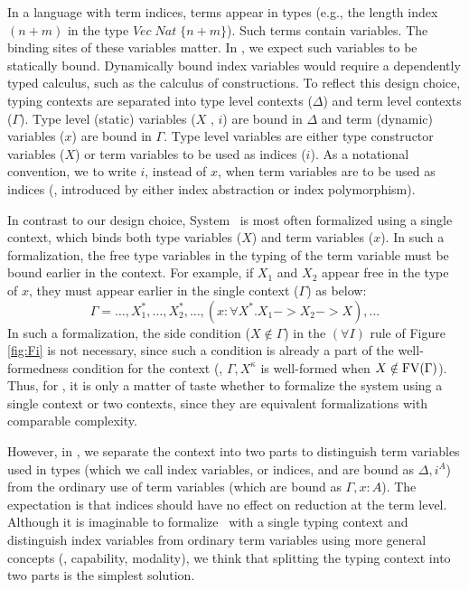 In a language with term indices, terms appear in types (e.g., the length index
$(n+m)$ in the type $\textit{Vec}\;\textit{Nat}\;\{n+m\}$).
Such terms contain variables. The binding sites of these variables matter.
In \Fi, we expect such variables to be statically bound. Dynamically bound
index variables would require a dependently typed calculus, such as
the calculus of constructions. To reflect this design choice,
typing contexts are separated into type level contexts ($\Delta$) and
term level contexts ($\Gamma$). Type level (static) variables ($X$ , $i$) are
bound in $\Delta$ and term (dynamic) variables ($x$) are bound in $\Gamma$.
Type level variables are either type constructor variables ($X$) or
term variables to be used as indices ($i$). As a notational convention,
we to write $i$, instead of $x$, when term variables are to be used as indices
(\ie, introduced by either index abstraction or index polymorphism).

In contrast to our design choice, System \Fw\ is most often formalized using
a single context, which binds both type variables ($X$) and term variables
($x$). In such a formalization, the free type variables in the typing of
the term variable must be bound earlier in the context. For example,
if $X_1$ and $X_2$ appear free in the type of $x$, they must appear earlier
in the single context ($\Gamma$) as below:
\[ \Gamma = \dots,X_1^{*},\dots,X_2^{*},\dots,
		(x:\forall X^{*}.X_1 -> X_2 -> X),\dots \]
In such a formalization, the side condition ($X\notin\Gamma$)
in the $(\forall I)$ rule of Figure \ref{fig:Fi} is not necessary,
since such a condition is already a part of the well-formedness condition
for the context (\ie, $\Gamma,X^\kappa$ is well-formed when
$X\notin\mathop{\mathrm{FV}}(\Gamma)$). Thus, for \Fw, it is only a matter of taste
whether to formalize the system using a single context or two contexts,
since they are equivalent formalizations with comparable complexity.

However, in \Fi, we separate the context into two parts to distinguish
term variables used in types (which we call index variables, or indices,
and are bound as $\Delta,i^A$) from the ordinary use of term variables
(which are bound as $\Gamma,x : A$). The expectation is that indices
should have no effect on reduction at the term level.
Although it is imaginable to formalize \Fi\ with a single typing context
and distinguish index variables from ordinary term variables using
more general concepts (\eg, capability, modality), we think that splitting
the typing context into two parts is the simplest solution.

